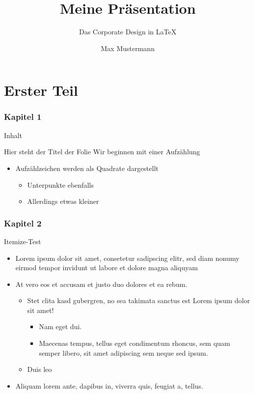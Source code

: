 \documentclass[fleqn,11pt,aspectratio=43]{beamer}
\title{Meine Präsentation}
\subtitle{Das Corporate Design in  \LaTeX}
\author{Max Mustermann}
\begin{document}
\begin{frame}[plain]
\titlepage
\end{frame}

\part{Erster Teil}

\begin{frame}[plain]
  \partpage
\end{frame}


\section{Kapitel 1}

\begin{frame}{Inhalt}
\tableofcontents
\end{frame}

\begin{frame}{Hier steht der Titel der Folie}
Wir beginnen mit einer Aufzählung
\begin{itemize}
  \item Aufzählzeichen werden als Quadrate dargestellt
  \begin{itemize}
    \item Unterpunkte ebenfalls
    \item Allerdings etwas kleiner
  \end{itemize}
\end{itemize}
\end{frame}

\section{Kapitel 2}


\begin{frame}{Itemize-Test}
  \begin{itemize}
    \item Lorem ipsum dolor sit amet, consetetur sadipscing elitr, sed diam
      nonumy eirmod tempor invidunt ut labore et dolore magna aliquyam
    \item At vero eos et accusam et justo duo dolores et ea rebum.
      \begin{itemize}
        \item Stet clita kasd gubergren, no sea takimata sanctus est Lorem ipsum
          dolor sit amet!
          \begin{itemize}
            \item Nam eget dui.
            \item Maecenas tempus, tellus eget condimentum rhoncus, sem quam
              semper libero, sit amet adipiscing sem neque sed ipsum.
          \end{itemize}
        \item Duis leo
      \end{itemize}
    \item Aliquam lorem ante, dapibus in, viverra quis, feugiat a, tellus. 
  \end{itemize}
\end{frame}
\end{document}
